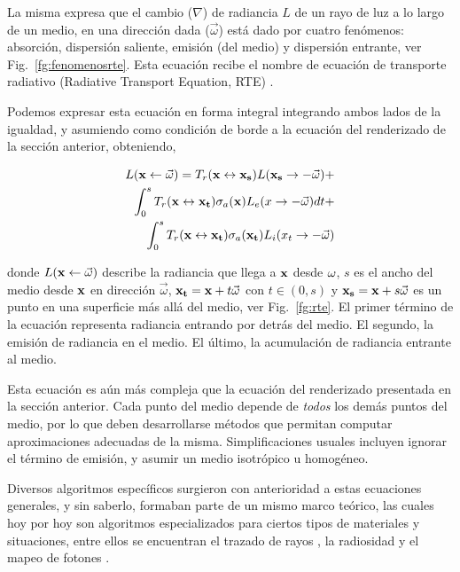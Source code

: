 La misma expresa que el cambio ($\nabla$) de radiancia $L$ de un rayo de luz a lo largo de un medio, en una dirección dada ($\vec{\omega}$) está dado por cuatro fenómenos:   absorción, dispersión saliente, emisión (del medio) y dispersión entrante, ver Fig.~\ref{fg:fenomenosrte}.
Esta ecuación recibe el nombre de ecuación de transporte radiativo (Radiative Transport Equation, RTE) \cite{Chandrasekhar1960}.

Podemos expresar esta ecuación en forma integral integrando ambos lados de la igualdad, y asumiendo como condición de borde a la ecuación del renderizado de la sección anterior, obteniendo,

\begin{equation}
\begin{aligned}
L(\bold{x} \leftarrow \vec{\omega}) = T_{r}(\bold{x} \leftrightarrow \bold{x_{s}}) L(\bold{x_{s}} \rightarrow -\vec{\omega}) + \\
\int_{0}^{s}{T_{r}(\bold{x} \leftrightarrow \bold{x_{t}}) \sigma_{a}(\bold{x}) L_{e}(x \rightarrow -\vec{\omega}) dt } + \\
\int_{0}^{s}{T_{r}(\bold{x} \leftrightarrow \bold{x_{t}}) \sigma_{a}(\bold{x_{t}}) L_{i}(x_{t} \rightarrow -\vec{\omega})  }
\end{aligned}
\end{equation}

donde $L(\bold{x} \leftarrow \vec{\omega})$ describe la radiancia que llega a $\bold{x}$ desde $\bold{\omega}$, $s$ es el ancho del medio desde $\bold{x}$ en dirección $\vec{\omega}$, $\bold{x_{t}} = \bold{x} + t\vec{\omega}$ con $t \in (0,s)$ y $\bold{x_{s}} = \bold{x}+ s\vec{\omega}$ es un punto en una superficie más allá del medio, ver Fig.~\ref{fg:rte}.
El primer término de la ecuación representa radiancia entrando por detrás del medio.
El segundo, la emisión de radiancia en el medio.
El último, la acumulación de radiancia entrante al medio. 

Esta ecuación es aún más compleja que la ecuación del renderizado presentada en la sección anterior.
Cada punto del medio depende de {\em todos} los demás puntos del medio, por lo que deben desarrollarse métodos que permitan computar aproximaciones adecuadas de la misma.
Simplificaciones usuales incluyen ignorar el término de emisión, y asumir un medio isotrópico u homogéneo.

Diversos algoritmos específicos surgieron con anterioridad a estas ecuaciones generales, y sin saberlo, formaban parte de un mismo marco teórico, las cuales hoy por hoy son algoritmos especializados para ciertos tipos de materiales y situaciones, entre ellos se encuentran el trazado de rayos \cite{}, la radiosidad \cite{} y el mapeo de fotones \cite{}.



